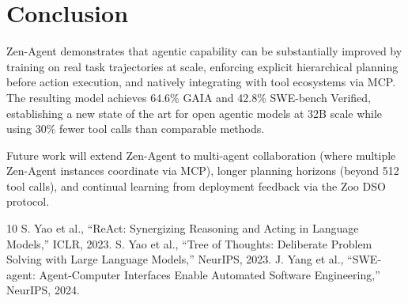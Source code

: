 \documentclass[11pt,a4paper]{article}
\begin{document}
\section{Conclusion}

Zen-Agent demonstrates that agentic capability can be substantially improved by training on
real task trajectories at scale, enforcing explicit hierarchical planning before action
execution, and natively integrating with tool ecosystems via MCP. The resulting model achieves
64.6\% GAIA and 42.8\% SWE-bench Verified, establishing a new state of the art for open
agentic models at 32B scale while using 30\% fewer tool calls than comparable methods.

Future work will extend Zen-Agent to multi-agent collaboration (where multiple Zen-Agent
instances coordinate via MCP), longer planning horizons (beyond 512 tool calls), and
continual learning from deployment feedback via the Zoo DSO protocol.

\begin{thebibliography}{10}
 S. Yao et al., ``ReAct: Synergizing Reasoning and Acting in Language Models,'' ICLR, 2023.
 S. Yao et al., ``Tree of Thoughts: Deliberate Problem Solving with Large Language Models,'' NeurIPS, 2023.
 J. Yang et al., ``SWE-agent: Agent-Computer Interfaces Enable Automated Software Engineering,'' NeurIPS, 2024.
\end{thebibliography}
\end{document}
